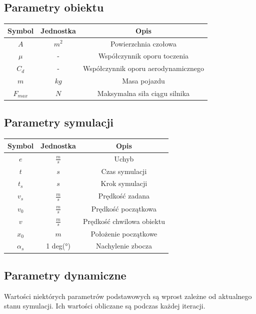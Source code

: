 \documentclass[12pt,a4paper]{article}
\begin{document}
	\subsection{Parametry obiektu}
	\begin{center}
		\begin{tabular}{|c|c|c|}
			\hline
			Symbol & Jednostka & Opis \\
			\hline
			\hline
			$A$ & $m^2$ & Powierzchnia czołowa \\
			\hline
			$\mu$ & - & Współczynnik oporu toczenia \\
			\hline
			$C_d$ & - & Współczynnik oporu aerodynamicznego \\
			\hline
			$m$ & $kg$ & Masa pojazdu \\
			\hline
			$F_{max}$ & $N$ & Maksymalna siła ciągu silnika \\
			\hline
			
		\end{tabular}
	\end{center}

	\subsection{Parametry symulacji}
	\begin{center}
		\begin{tabular}{|c|c|c|}
			\hline
			Symbol & Jednostka & Opis \\
			\hline
			\hline
			$e$ & $\frac{m}{s}$ & Uchyb \\
			\hline
			$t$ & $s$ & Czas symulacji \\
			\hline
			$t_s$ & $s$ & Krok symulacji \\
			\hline
			$v_s$ & $\frac{m}{s}$ & Prędkość zadana \\
			\hline
			$v_0$ & $\frac{m}{s}$ & Prędkość początkowa \\
			\hline
			$v$ & $\frac{m}{s}$ & Prędkość chwilowa obiektu \\
			\hline
			$x_0$ & $m$ & Położenie początkowe \\
			\hline
			$\alpha_s$ & 1 deg(°) & Nachylenie zbocza \\
			\hline
		\end{tabular}
	\end{center}
	
	\subsection{Parametry dynamiczne}
	Wartości niektórych parametrów podstawowych są wprost zależne od aktualnego stanu symulacji. Ich wartości obliczane są podczas każdej iteracji.
	
\end{document}
